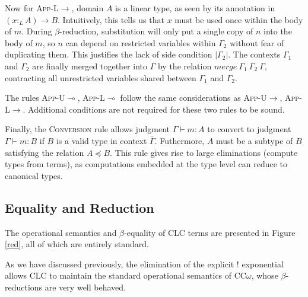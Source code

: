 \documentclass[sigplan,screen,review,anonymous]{acmart}
\newcommand{\rname}[1]{\textsc{\footnotesize #1}}
\newcommand{\pure}[1]{|#1|}
\newcommand{\ltype}{:_{\scriptscriptstyle L}}
\newcommand{\mrg}[3]{merge\ {#1}\ {#2}\ {#3}}
\begin{document}
Now for \rname{App-L$\rightarrow$}, domain $A$ is a linear type, as seen by its annotation in $(x \ltype A) \rightarrow B$. Intuitively, this tells us that $x$ must be used once within the body of $m$. During $\beta$-reduction, substitution will only put a single copy of $n$ into the body of $m$, so $n$ can depend on restricted variables within $\Gamma_2$ without fear of duplicating them. This justifies the lack of side condition $\pure{\Gamma_2}$. The contexts $\Gamma_1$ and $\Gamma_2$ are finally merged together into $\Gamma$ by the relation $\mrg{\Gamma_1}{\Gamma_2}{\Gamma}$, contracting all unrestricted variables shared between $\Gamma_1$ and $\Gamma_2$.

The rules \rname{App-U$\multimap$}, \rname{App-L$\multimap$} follow the same considerations as \rname{App-U$\rightarrow$}, \rname{App-L$\rightarrow$}. Additional conditions are not required for these two rules to be sound.

Finally, the \rname{Conversion} rule allows judgment $\Gamma \vdash m : A$ to convert to judgment $\Gamma \vdash m : B$ if $B$ is a valid type in context $\overline{\Gamma}$. Futhermore, $A$ must be a subtype of $B$ satisfying the relation $A \preceq B$. This rule gives rise to large eliminations (compute types from terms), as computations embedded at the type level can reduce to canonical types.

\subsection{Equality and Reduction} \label{reduction}
The operational semantics and $\beta$-equality of CLC terms are presented in Figure \ref{red}, all of which are entirely standard.

As we have discussed previously, the elimination of the explicit ! exponential allows CLC to maintain the standard operational semantics of CC$\omega$, whose $\beta$-reductions are very well behaved.
\end{document}
